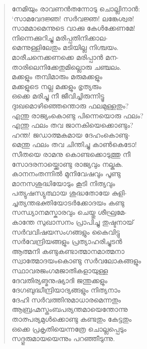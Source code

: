 \begin{verse}
നേമിയും രാവണന്‍തന്നോടു ചൊല്ലിനാന്‍:\\
‘സാമവേദജ്ഞ! സര്‍വജ്ഞ! ലങ്കേശ്വര!\\
സാമമാമെന്നുടെ വാക്കു കേള്‍ക്കേണമേ!\\
നിന്നെക്കുറിച്ചു മരിപ്പതിനിക്കാല-\\
മെന്നുള്ളിലേതും മടിയില്ല നിശ്ചയം.\\
മാരീചനെക്കണക്കെ മരിപ്പാന്‍ മന-\\
താരിലെനിക്കേതുമില്ലൊരു ചഞ്ചലം.\\
മക്കളും തമ്പിമാരും മരുമക്കളും\\
മക്കളുടെ നല്ല മക്കളും ഭൃത്യരും\\
ഒക്കെ മരിച്ചു നീ ജീവിച്ചിരുന്നിട്ടൂ\\
ദുഃഖമൊഴിഞ്ഞെന്തൊരു ഫലമുള്ളതും?\\
എന്തു രാജ്യംകൊണ്ടു പിന്നെയൊരു ഫലം?\\
എന്തു ഫലം തവ ജാനകിയെക്കൊണ്ടും?\\
ഹന്ത! ജഡാത്മകമായ ദേഹംകൊണ്ടു-\\
മെന്തു ഫലം തവ ചിന്തിച്ചു കാണ്‍കെടോ!\\
സീതയെ രാമനു കൊണ്ടക്കൊടുത്തു നീ\\
സോദരനായ്ക്കൊണ്ടു രാജ്യവും നല്കുക.\\
കാനനംതന്നില്‍ മുനിവേഷവും പൂണ്ടു\\
മാനസശുദ്ധിയോടും കൂടി നിത്യവും\\
പത്യുഷസ്യുത്ഥായ ശുദ്ധതോയേ കുളി-\\
ച്ചത്യന്തഭക്തിയോടര്‍ക്കോദയം കണ്ടു\\
സന്ധ്യാനമസ്കാരവും ചെയ്തു ശീഘ്രമേ-\\
കാന്തേ സുഖാസനം പ്രാപിച്ചു തുഷ്ടനായ്\\
സര്‍വവിഷയസംഗങ്ങളും കൈവിട്ടു\\
സര്‍വേന്ദ്രിയങ്ങളും പ്രത്യാഹരിച്ചുടന്‍\\
ആത്മനി കണ്ടുകണ്ടാത്മാനമാത്മനാ\\
സ്വാത്മോദയംകൊണ്ടു സര്‍വലോകങ്ങളും\\
സ്ഥാവരജംഗമജാതികളായുള്ള\\
ദേവതിര്യങ്മനുഷ്യാദി ജന്തുക്കളും\\
ദേഗബുദ്ധീന്ദ്രിയാദ്യങ്ങളും നിത്യനാം\\
ദേഹി സര്‍വത്തിനുമാധാരമെന്നതും\\
ആബ്രഹ്മസ്തംബപര്യന്തമായെന്തോന്നു\\
താത്പര്യമുള്‍ക്കൊണ്ടു കണ്ടതും കേട്ടതും\\
ഒക്കെ പ്രകൃതിയെന്നത്രേ ചൊല്ലപ്പെടും\\
സദ്ഗുരുമായയെന്നും പറഞ്ഞീടുന്നു.\\

\end{verse}
